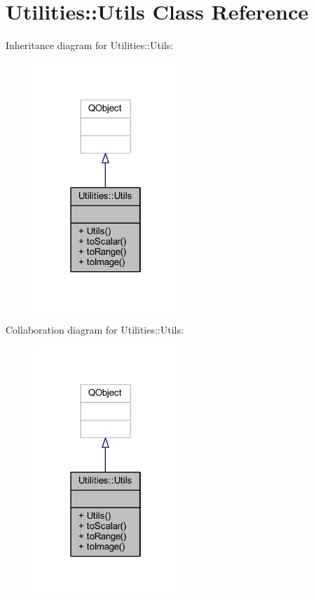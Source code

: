 \hypertarget{class_utilities_1_1_utils}{}\section{Utilities\+:\+:Utils Class Reference}
\label{class_utilities_1_1_utils}


Inheritance diagram for Utilities\+:\+:Utils\+:\nopagebreak
\begin{figure}[H]
\begin{center}
\leavevmode
\includegraphics[width=154pt]{dc/d46/class_utilities_1_1_utils__inherit__graph}
\end{center}
\end{figure}


Collaboration diagram for Utilities\+:\+:Utils\+:\nopagebreak
\begin{figure}[H]
\begin{center}
\leavevmode
\includegraphics[width=154pt]{dd/db7/class_utilities_1_1_utils__coll__graph}
\end{center}
\end{figure}
